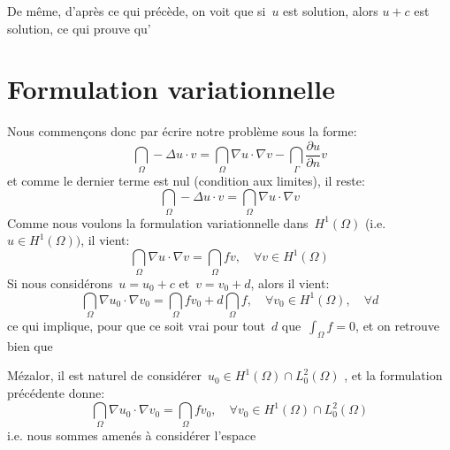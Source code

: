 De même, d'après ce qui précède, on voit que si~$u$ est solution, alors $u+c$ est solution, ce qui prouve qu'

\medskip
\section{Formulation variationnelle}

\medskip
Nous commençons donc par écrire notre problème sous la forme:
\begin{equation}
\dint_\Omega -\Delta u\cdot v = \dint_\Omega \nabla u\cdot \nabla v - \dint_\Gamma \frac{\partial u}{\partial n} v
\end{equation}
et comme le dernier terme est nul (condition aux limites), il reste:
\begin{equation}
\dint_\Omega -\Delta u\cdot v = \dint_\Omega \nabla u\cdot \nabla v
\end{equation}
Comme nous voulons la formulation variationnelle dans~$H^1(\Omega)$ (i.e.~$u\in H^1(\Omega))$, il vient:
\begin{equation}
\dint_\Omega \nabla u\cdot \nabla v = \dint_\Omega f v, \quad \forall v\in H^1(\Omega)
\end{equation}
\medskip
Si nous considérons~$u=u_0+c$ et~$v=v_0+d$, alors il vient:
\begin{equation}
\dint_\Omega \nabla u_0\cdot\nabla v_0 = \dint_\Omega f v_0 + d\dint_\Omega f, \quad \forall v_0\in H^1(\Omega),\quad \forall d
\end{equation}
ce qui implique, pour que ce soit vrai pour tout~$d$ que~$\int_\Omega f=0$, et on retrouve bien que 

\medskip
Mézalor, il est naturel de considérer~$u_0\in H^1(\Omega)\cap L^2_0(\Omega)$ , et la formulation précédente donne:
\begin{equation}
\dint_\Omega \nabla u_0\cdot\nabla v_0 = \dint_\Omega f v_0,
\quad \forall v_0\in H^1(\Omega)\cap L^2_0(\Omega)
\end{equation}
i.e. nous sommes amenés à considérer l'espace 


